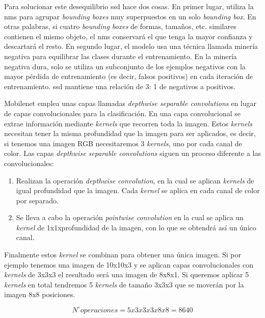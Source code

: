Para solucionar este desequilibrio \acrshort{ssd} hace dos cosas. En primer lugar, utiliza la \acrfull{nms} para agrupar \textit{bounding boxes} muy superpuestos en un solo \textit{bounding box}. En otras palabras, si cuatro \textit{bounding boxes} de formas, tamaños, etc. similares contienen el mismo objeto, el \acrshort{nms} conservará el que tenga la mayor confianza y descartará el resto. En segundo lugar, el modelo usa una técnica llamada minería negativa para equilibrar las clases durante el entrenamiento. En la minería negativa dura, solo se utiliza un subconjunto de los ejemplos negativos con la mayor pérdida de entrenamiento (es decir, falsos positivos) en cada iteración de entrenamiento. \acrshort{ssd} mantiene una relación de 3: 1 de negativos a positivos.


Mobilenet emplea unas capas llamadas \textit{depthwise separable convolutions} en lugar de capas convolucionales para la clasificación. En una capa convolucional se extrae información mediante \textit{kernels} que recorren toda la imagen. Estos \textit{kernels} necesitan tener la misma profundidad que la imagen para ser aplicados, es decir, si tenemos una imagen RGB necesitaremos 3 \textit{kernels}, uno por cada canal de color. Las capas \textit{depthwise separable convolutions} siguen un proceso diferente a las convolucionales: 

\begin{enumerate}
    \item Realizan la operación \textit{depthwise convolution}, en la cual se aplican \textit{kernels} de igual profundidad que la imagen. Cada \textit{kernel} se aplica en cada canal de color por separado.
    \item Se lleva a cabo la operación \textit{pointwise convolution} en la cual se aplica un \textit{kernel} de 1x1xprofundidad de la imagen, con lo que se obtendrá así un único canal.
\end{enumerate}

Finalmente estos \textit{kernel} se combinan para obtener una única imagen. 
Si por ejemplo tenemos una imagen de 10x10x3 y se aplican capas convolucionales con \textit{kernels} de 3x3x3 el resultado será una imagen de 8x8x1. Si queremos aplicar 5 \textit{kernels} en total tendremos 5 \textit{kernels} de tamaño 3x3x3 que se moverán por la imagen 8x8 posiciones.

\begin{equation}\label{convolucional_formula}
N^{\circ} operaciones = 5x3x3x3x8x8 = 8640
\end{equation}

